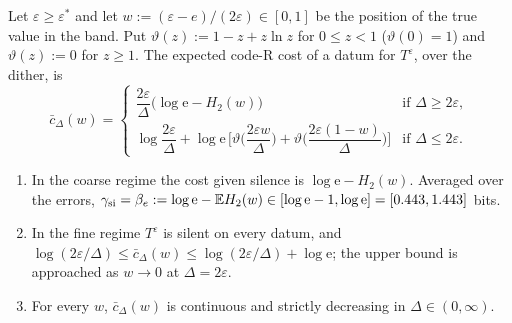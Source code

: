 \begin{lemma}\label{lem:laws:codeR}
Let $\varepsilon\ge\varepsilon^*$ and let $w:=(\varepsilon-e)/(2\varepsilon)\in[0,1]$ be the position of the true value in the band. Put $\vartheta(z):=1-z+z\ln z$ for $0\le z<1$ ($\vartheta(0)=1$) and $\vartheta(z):=0$ for $z\ge1$. The expected code-R cost of a datum for $T^\varepsilon$, over the dither, is
\[\bar c_\Delta(w)=\begin{cases}\dfrac{2\varepsilon}{\Delta}\big(\log\mathrm e-H_2(w)\big)&\text{if }\Delta\ge2\varepsilon,\\[2mm]\log\dfrac{2\varepsilon}{\Delta}+\log\mathrm e\,\Big[\vartheta\Big(\dfrac{2\varepsilon w}{\Delta}\Big)+\vartheta\Big(\dfrac{2\varepsilon(1-w)}{\Delta}\Big)\Big]&\text{if }\Delta\le2\varepsilon.\end{cases}\]
\begin{enumerate}[label=(\roman*),itemsep=1pt,topsep=2pt]
\item In the coarse regime the cost given silence is $\log\mathrm e-H_2(w)$. Averaged over the errors, $\gamma_{\rm si}=\beta_e:=\log\mathrm e-\mathbb{E} H_2(w)\in[\log\mathrm e-1,\log\mathrm e]=[0.443,1.443]$ bits.
\item In the fine regime $T^\varepsilon$ is silent on every datum, and $\log(2\varepsilon/\Delta)\le\bar c_\Delta(w)\le\log(2\varepsilon/\Delta)+\log\mathrm e$; the upper bound is approached as $w\to0$ at $\Delta=2\varepsilon$.
\item For every $w$, $\bar c_\Delta(w)$ is continuous and strictly decreasing in $\Delta\in(0,\infty)$.
\end{enumerate}
\end{lemma}

